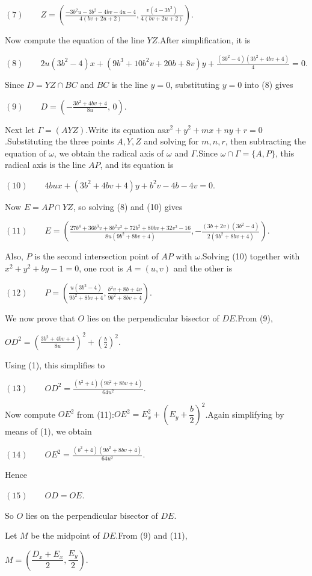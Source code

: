 \begin{enumerate}
 $(7)\qquad Z=\left( \frac{-3b^2u-3b^2-4bv-4u-4}{4(bv+2u+2)}, \frac{v(4-3b^2)}{4(bv+2u+2)} \right).$

 Now compute the equation of the line $YZ$.After simplification, it is

 $(8)\qquad 2u(3b^2-4)x+(9b^3+10b^2v+20b+8v)y+\frac{(3b^2-4)(3b^2+4bv+4)}{4}=0.$

 Since $D=YZ\cap BC$ and $BC$ is the line $y=0$, substituting $y=0$ into (8) gives

 $(9)\qquad D=\left(-\frac{3b^2+4bv+4}{8u},\,0\right).$

 Next let $\Gamma=(AYZ)$.Write its equation as$x^2+y^2+mx+ny+r=0$.Substituting the three points $A,Y,Z$ and solving for $m,n,r$, then subtracting the equation of $\omega$, we obtain the radical axis of $\omega$ and $\Gamma$.Since $\omega\cap\Gamma=\{A,P\}$, this radical axis is the line $AP$, and its equation is

 $(10)\qquad 4bux+(3b^2+4bv+4)y+b^2v-4b-4v=0.$

 Now $E=AP\cap YZ$, so solving (8) and (10) gives

 $(11)\qquad E=\left( \frac{27b^4+36b^3v+8b^2v^2+72b^2+80bv+32v^2-16}{8u(9b^2+8bv+4)}, -\frac{(3b+2v)(3b^2-4)}{2(9b^2+8bv+4)} \right).$

 Also, $P$ is the second intersection point of $AP$ with $\omega$.Solving (10) together with $x^2+y^2+by-1=0$, one root is $A=(u,v)$ and the other is

 $(12)\qquad P=\left( \frac{u(3b^2-4)}{9b^2+8bv+4}, \frac{b^2v+8b+4v}{9b^2+8bv+4} \right).$

 We now prove that $O$ lies on the perpendicular bisector of $DE$.From (9),

 $OD^2=\left(\frac{3b^2+4bv+4}{8u}\right)^2+\left(\frac b2\right)^2.$

 Using (1), this simplifies to

 $(13)\qquad OD^2=\frac{(b^2+4)(9b^2+8bv+4)}{64u^2}.$

 Now compute $OE^2$ from (11):$OE^2=E_x^2+\left(E_y+\dfrac b2\right)^2$.Again simplifying by means of (1), we obtain

 $(14)\qquad OE^2=\frac{(b^2+4)(9b^2+8bv+4)}{64u^2}.$

 Hence

 $(15)\qquad OD=OE.$

 So $O$ lies on the perpendicular bisector of $DE$.

 Let $M$ be the midpoint of $DE$.From (9) and (11),

 $M=\left(\dfrac{D_x+E_x}{2},\dfrac{E_y}{2}\right).$


\end{enumerate}
